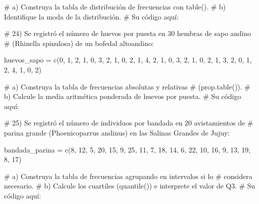 \documentclass[
  spanish,
  letterpaper,
  DIV=11,
  numbers=noendperiod]{scrreprt}
\newenvironment{Shaded}{\begin{snugshade}}{\end{snugshade}}
\newcommand{\CommentTok}[1]{\textcolor[rgb]{0.37,0.37,0.37}{#1}}
\newcommand{\DecValTok}[1]{\textcolor[rgb]{0.68,0.00,0.00}{#1}}
\newcommand{\FunctionTok}[1]{\textcolor[rgb]{0.28,0.35,0.67}{#1}}
\newcommand{\NormalTok}[1]{\textcolor[rgb]{0.00,0.23,0.31}{#1}}
\newcommand{\OtherTok}[1]{\textcolor[rgb]{0.00,0.23,0.31}{#1}}
\begin{document}
\begin{Shaded}
\begin{Highlighting}[]
\CommentTok{\#     a) Construya la tabla de distribución de frecuencias con table().}
\CommentTok{\#     b) Identifique la moda de la distribución.}
\CommentTok{\# Su código aquí:}


\CommentTok{\# 24) Se registró el número de huevos por puesta en 30 hembras de sapo andino}
\CommentTok{\#     (Rhinella spinulosa) de un bofedal altoandino:}

\NormalTok{huevos\_sapo }\OtherTok{=} \FunctionTok{c}\NormalTok{(}\DecValTok{0}\NormalTok{, }\DecValTok{1}\NormalTok{, }\DecValTok{2}\NormalTok{, }\DecValTok{1}\NormalTok{, }\DecValTok{0}\NormalTok{, }\DecValTok{3}\NormalTok{, }\DecValTok{2}\NormalTok{, }\DecValTok{1}\NormalTok{, }\DecValTok{0}\NormalTok{, }\DecValTok{2}\NormalTok{,}
                \DecValTok{1}\NormalTok{, }\DecValTok{4}\NormalTok{, }\DecValTok{2}\NormalTok{, }\DecValTok{1}\NormalTok{, }\DecValTok{0}\NormalTok{, }\DecValTok{3}\NormalTok{, }\DecValTok{2}\NormalTok{, }\DecValTok{1}\NormalTok{, }\DecValTok{0}\NormalTok{, }\DecValTok{2}\NormalTok{,}
                \DecValTok{1}\NormalTok{, }\DecValTok{3}\NormalTok{, }\DecValTok{2}\NormalTok{, }\DecValTok{0}\NormalTok{, }\DecValTok{1}\NormalTok{, }\DecValTok{2}\NormalTok{, }\DecValTok{4}\NormalTok{, }\DecValTok{1}\NormalTok{, }\DecValTok{0}\NormalTok{, }\DecValTok{2}\NormalTok{)}

\CommentTok{\#     a) Construya la tabla de frecuencias absolutas y relativas}
\CommentTok{\#        (prop.table()).}
\CommentTok{\#     b) Calcule la media aritmética ponderada de huevos por puesta.}
\CommentTok{\# Su código aquí:}


\CommentTok{\# 25) Se registró el número de individuos por bandada en 20 avistamientos de}
\CommentTok{\#     parina grande (Phoenicoparrus andinus) en las Salinas Grandes de Jujuy:}

\NormalTok{bandada\_parina }\OtherTok{=} \FunctionTok{c}\NormalTok{(}\DecValTok{8}\NormalTok{, }\DecValTok{12}\NormalTok{, }\DecValTok{5}\NormalTok{, }\DecValTok{20}\NormalTok{, }\DecValTok{15}\NormalTok{, }\DecValTok{9}\NormalTok{, }\DecValTok{25}\NormalTok{, }\DecValTok{11}\NormalTok{, }\DecValTok{7}\NormalTok{, }\DecValTok{18}\NormalTok{,}
                    \DecValTok{14}\NormalTok{, }\DecValTok{6}\NormalTok{, }\DecValTok{22}\NormalTok{, }\DecValTok{10}\NormalTok{, }\DecValTok{16}\NormalTok{, }\DecValTok{9}\NormalTok{, }\DecValTok{13}\NormalTok{, }\DecValTok{19}\NormalTok{, }\DecValTok{8}\NormalTok{, }\DecValTok{17}\NormalTok{)}

\CommentTok{\#     a) Construya la tabla de frecuencias agrupando en intervalos si lo}
\CommentTok{\#        considera necesario.}
\CommentTok{\#     b) Calcule los cuartiles (quantile()) e interprete el valor de Q3.}
\CommentTok{\# Su código aquí:}



\end{Highlighting}
\end{Shaded}
\end{document}
